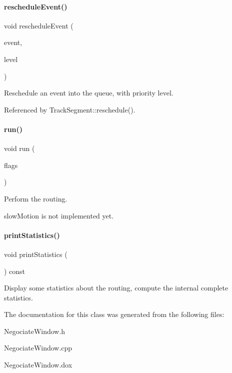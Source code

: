 \paragraph{\texorpdfstring{reschedule\+Event()}{rescheduleEvent()}}
{\footnotesize\ttfamily void reschedule\+Event (\begin{DoxyParamCaption}\item[{\hyperlink{classKite_1_1RoutingEvent}{Routing\+Event} $\ast$}]{event,  }\item[{unsigned int}]{level }\end{DoxyParamCaption})\hspace{0.3cm}{\ttfamily [inline]}}

Reschedule an event into the queue, with priority {\ttfamily level}. 

Referenced by Track\+Segment\+::reschedule().

\mbox{\label{classKite_1_1NegociateWindow_a61e848b73b597f54e2e83e13eb70ff83}} 
\paragraph{\texorpdfstring{run()}{run()}}
{\footnotesize\ttfamily void run (\begin{DoxyParamCaption}\item[{unsigned int}]{flags }\end{DoxyParamCaption})}

Perform the routing.

{\ttfamily slow\+Motion} is not implemented yet. \mbox{\label{classKite_1_1NegociateWindow_a8d3dfaa30cedabd6b64977827ac989d8}} 
\paragraph{\texorpdfstring{print\+Statistics()}{printStatistics()}}
{\footnotesize\ttfamily void print\+Statistics (\begin{DoxyParamCaption}{ }\end{DoxyParamCaption}) const}

Display some statistics about the routing, compute the internal complete statistics. 

The documentation for this class was generated from the following files\+:\begin{DoxyCompactItemize}
\item 
Negociate\+Window.\+h\item 
Negociate\+Window.\+cpp\item 
Negociate\+Window.\+dox\end{DoxyCompactItemize}
